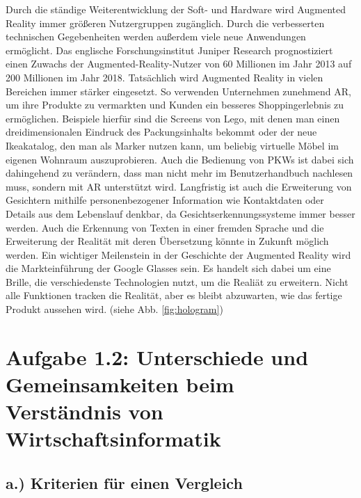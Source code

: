\documentclass[12pt,utf8]{scrartcl}
\begin{document}
\begin{flushleft}
Durch die ständige Weiterentwicklung der Soft- und Hardware wird Augmented Reality immer größeren Nutzergruppen zugänglich. Durch die verbesserten technischen Gegebenheiten werden außerdem viele neue Anwendungen ermöglicht. Das englische Forschungsinstitut Juniper Research prognostiziert einen Zuwachs der Augmented-Reality-Nutzer von 60 Millionen im Jahr 2013 auf 200 Millionen im Jahr 2018. Tatsächlich wird Augmented Reality in vielen Bereichen immer stärker eingesetzt. So verwenden Unternehmen zunehmend AR, um ihre Produkte zu vermarkten und Kunden ein besseres Shoppingerlebnis zu ermöglichen. Beispiele hierfür sind die Screens von Lego, mit denen man einen dreidimensionalen Eindruck des Packungsinhalts bekommt oder der neue Ikeakatalog, den man als Marker nutzen kann, um beliebig virtuelle Möbel im eigenen Wohnraum auszuprobieren. Auch die Bedienung von PKWs ist dabei sich dahingehend zu verändern, dass man nicht mehr im Benutzerhandbuch nachlesen muss, sondern mit AR unterstützt wird. Langfristig ist auch die Erweiterung von Gesichtern mithilfe personenbezogener Information wie Kontaktdaten oder Details aus dem Lebenslauf denkbar, da Gesichtserkennungssysteme immer besser werden. Auch die Erkennung von Texten in einer fremden Sprache und die Erweiterung der Realität mit deren Übersetzung könnte in Zukunft möglich werden. Ein wichtiger Meilenstein in der Geschichte der Augmented Reality wird die Markteinführung der Google Glasses sein. Es handelt sich dabei um eine Brille, die verschiedenste Technologien nutzt, um die Realiät zu erweitern. Nicht alle Funktionen tracken die Realität, aber es bleibt abzuwarten, wie das fertige Produkt aussehen wird. (siehe Abb. \ref{fig:hologram})

\section{\label{sec:einfuehrung}Aufgabe 1.2: Unterschiede und Gemeinsamkeiten beim Verständnis von Wirtschaftsinformatik}
\subsection{\label{sub:einfuehrung}a.) Kriterien für einen Vergleich}


\end{flushleft}
\end{document}
